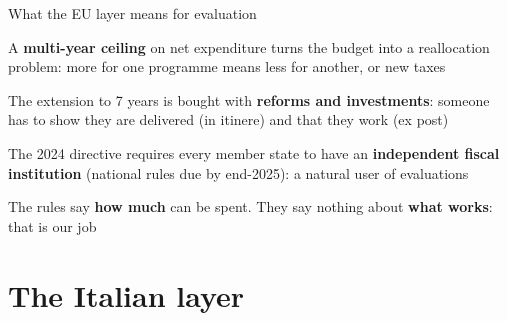 \documentclass[aspectratio=169,xcolor=table]{beamer}
\begin{document}
\begin{frame}{What the EU layer means for evaluation}
\bi
  \item A \textbf{multi-year ceiling} on net expenditure turns the budget into a reallocation problem: more for one programme means less for another, or new taxes
  \item The extension to 7 years is bought with \textbf{reforms and investments}: someone has to show they are delivered (in itinere) and that they work (ex post)
  \item The 2024 directive requires every member state to have an \textbf{independent fiscal institution} (national rules due by end-2025): a natural user of evaluations
\ei
\begin{block}{}
\centering The rules say \textbf{how much} can be spent. They say nothing about \textbf{what works}: that is our job
\end{block}
\end{frame}

\section{The Italian layer}
\end{document}
